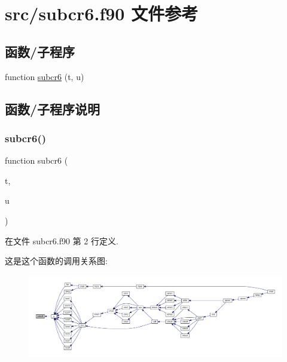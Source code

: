 \hypertarget{subcr6_8f90}{}\section{src/subcr6.f90 文件参考}
\label{subcr6_8f90}
\subsection*{函数/子程序}
\begin{DoxyCompactItemize}
\item 
function \mbox{\hyperlink{subcr6_8f90_a631eff8db3463ca6e59b030bee1913b7}{subcr6}} (t, u)
\end{DoxyCompactItemize}


\subsection{函数/子程序说明}
\mbox{\label{subcr6_8f90_a631eff8db3463ca6e59b030bee1913b7}} 
\subsubsection{\texorpdfstring{subcr6()}{subcr6()}}
{\footnotesize\ttfamily function subcr6 (\begin{DoxyParamCaption}\item[{}]{t,  }\item[{}]{u }\end{DoxyParamCaption})}



在文件 subcr6.\+f90 第 2 行定义.

这是这个函数的调用关系图\+:
\nopagebreak
\begin{figure}[H]
\begin{center}
\leavevmode
\includegraphics[width=350pt]{subcr6_8f90_a631eff8db3463ca6e59b030bee1913b7_icgraph}
\end{center}
\end{figure}
